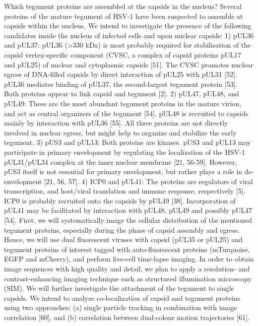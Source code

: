 Which tegument proteins are assembled at the capsids in the nucleus?
Several proteins of the mature tegument of HSV-1 have been suspected to assemble at capsids within the nucleus.
We intend to investigate the presence of the following candidates inside the nucleus of infected cells and upon nuclear capsids:
1)	pUL36 and pUL37:
pUL36 (>330 kDa) is most probably required for stabilisation of the capsid vertex-specific component (CVSC, a complex of capsid proteins pUL17 and pUL25) of nuclear and cytoplasmic capsids [51].
The CVSC promotes nuclear egress of DNA-filled capsids by direct interaction of pUL25 with pUL31 [52].
pUL36 mediates binding of pUL37, the second-largest tegument protein [53].
Both proteins appear to link capsid and tegument [2].
2)	pUL47, pUL48, and pUL49:
These are the most abundant tegument proteins in the mature virion, and act as central organizers of the tegument [54].
pUL48 is recruited to capsids mainly by interaction with pUL36 [55].
All three proteins are not directly involved in nuclear egress, but might help to organize and stabilize the early tegument.
3)	pUS3 and pUL13:
Both proteins are kinases.
pUS3 and pUL13 may participate in primary envelopment by regulating the localization of the HSV-1 pUL31/pUL34 complex at the inner nuclear membrane [21, 56-59].
However, pUS3 itself is not essential for primary envelopment, but rather plays a role in de-envelopment [21, 56, 57].
4)	ICP0 and pUL41: The proteins are regulators of viral transcription, and host/viral translation and immune response, respectively [5].
ICP0 is probably recruited onto the capsids by pUL49 [38].
Incorporation of pUL41 may be facilitated by interaction with pUL48, pUL49 and possibly pUL47 [54].
First, we will systematically image the cellular distribution of the mentioned tegument proteins, especially during the phase of capsid assembly and egress.
Hence, we will use dual fluorescent viruses with capsid (pUL35 or pUL25) and tegument proteins of interest tagged with auto-fluorescent proteins (mTurquoise, EGFP and mCherry), and perform live-cell time-lapse imaging.
In order to obtain image sequences with high quality and detail, we plan to apply a resolution- and contrast-enhancing imaging technique such as structured illumination microscopy (SIM).
We will further investigate the attachment of the tegument to single capsids.
We intend to analyze co-localization of capsid and tegument proteins using two approaches: (a) single particle tracking in combination with image correlation [60], and (b) correlation between dual-colour motion trajectories [61].

